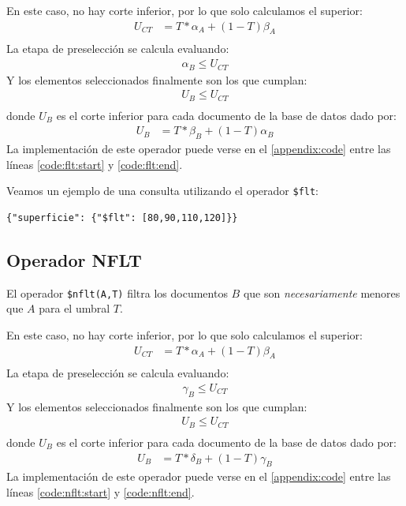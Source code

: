 En este caso, no hay corte inferior, por lo que solo calculamos el superior:
%
\begin{align*}
    U_{CT} &= T * \alpha_A + (1-T)\beta_A \\
\end{align*}
%
La etapa de preselección se calcula evaluando:
%
\begin{align*}
    \alpha_B \leq U_{CT}
\end{align*}
%
Y los elementos seleccionados finalmente son los que cumplan:
%
\begin{align*}
    U_B \leq U_{CT} \\
\end{align*}
%
donde $U_B$ es el corte inferior para cada documento de la base de datos dado por:
%
\begin{align*}
    U_B &= T * \beta_B + (1-T)\alpha_B
\end{align*}
%
La implementación de este operador puede verse en el \autoref{appendix:code} entre las líneas \ref{code:flt:start} y \ref{code:flt:end}.

\begin{example}
Veamos un ejemplo de una consulta utilizando el operador \texttt{\$flt}:
%
\begin{verbatim}
{"superficie": {"$flt": [80,90,110,120]}}
\end{verbatim}

\end{example}

\subsection{Operador NFLT}

El operador \texttt{\$nflt(A,T)} filtra los documentos $B$ que son \textit{necesariamente} menores que $A$ para el umbral $T$.

En este caso, no hay corte inferior, por lo que solo calculamos el superior:
%
\begin{align*}
    U_{CT} &= T * \alpha_A + (1-T)\beta_A \\
\end{align*}
%
La etapa de preselección se calcula evaluando:
%
\begin{align*}
    \gamma_B \leq U_{CT}
\end{align*}
%
Y los elementos seleccionados finalmente son los que cumplan:
%
\begin{align*}
    U_B \leq U_{CT} \\
\end{align*}
%
donde $U_B$ es el corte inferior para cada documento de la base de datos dado por:
%
\begin{align*}
    U_B &= T * \delta_B + (1-T)\gamma_B
\end{align*}
%
La implementación de este operador puede verse en el \autoref{appendix:code} entre las líneas \ref{code:nflt:start} y \ref{code:nflt:end}.

